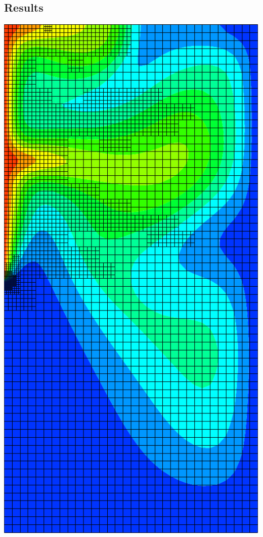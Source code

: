\documentclass[compress,12pt]{beamer}
\begin{document}
\subsection{Results}
\begin{frame}
  \centerline{\includegraphics[angle=270,width=\textwidth]{figures/elder_amr}}
\end{frame}
\end{document}
